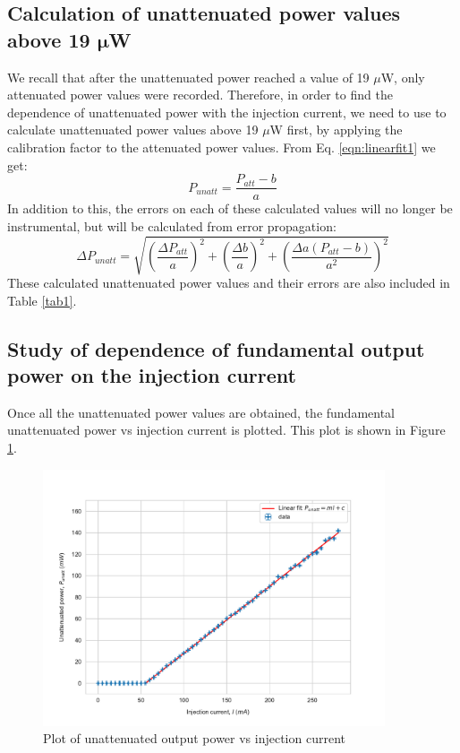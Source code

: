 \subsection{Calculation of unattenuated power values above 19 $\mathbf{\mu}$W}
We recall that after the unattenuated power reached a value of 19 $\mu$W, only attenuated power values were recorded. Therefore, in order to find the dependence of unattenuated power with the injection current, we need to use to calculate unattenuated power values above 19 $\mu$W first, by applying the calibration factor to the attenuated power values. From Eq. \ref{eqn:linearfit1} we get:
\begin{equation}
\label{eqn:punattfrompatt}
P_{unatt}=\dfrac{P_{att}-b}{a}
\end{equation}
In addition to this, the errors on each of these calculated values will no longer be instrumental, but will be calculated from error propagation:
\begin{equation}
\label{eqn:errorprop1}
\Delta P_{unatt}=\sqrt{\left(\dfrac{\Delta P_{att}}{a}\right)^{2}+\left(\dfrac{\Delta b}{a}\right)^{2}+\left(\dfrac{\Delta a(P_{att}-b)}{a^{2}}\right)^{2}}
\end{equation}
These calculated unattenuated power values and their errors are also included in Table \ref{tab1}.

\subsection{Study of dependence of fundamental output power on the injection current}
Once all the unattenuated power values are obtained, the fundamental unattenuated power vs injection current is plotted. This plot is shown in Figure \ref{figexpt3}. 

\begin{figure}[H]
\includegraphics[width=0.9\textwidth]{./imagesandplots/injcvsunattpow.pdf}
\centering
\caption{Plot of unattenuated output power vs injection current}
\label{figexpt3}
\end{figure}

